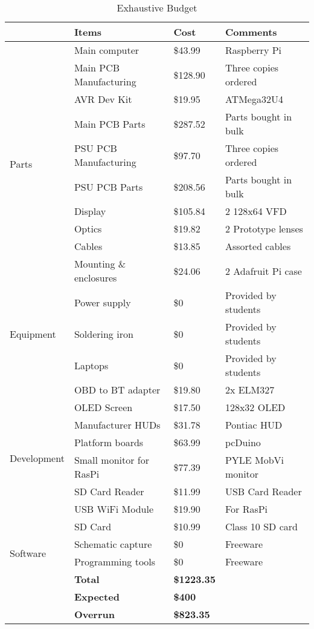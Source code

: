 \begin{table}
\centering
\begin{tabular}{|l|l|l|l|}
\hline
 & Items & Cost & Comments \\ \hline
\multirow{10}{*}{Parts}
 & Main computer            & \$43.99  & Raspberry Pi \cite{raspifaq} \\
 & Main PCB Manufacturing   & \$128.90 & Three copies ordered \\
 & AVR Dev Kit              & \$19.95  & ATMega32U4 \cite{atmega32u4ds} \\
 & Main PCB Parts           & \$287.52 & Parts bought in bulk \\
 & PSU PCB Manufacturing    & \$97.70  & Three copies ordered \\
 & PSU PCB Parts            & \$208.56 & Parts bought in bulk \\
 & Display                  & \$105.84  & 2 128x64  VFD \\
 & Optics                   & \$19.82  & 2 Prototype lenses \\
 & Cables                   & \$13.85  & Assorted cables \\
 & Mounting \& enclosures   & \$24.06  & 2 Adafruit Pi case \\ \hline
\multirow{3}{*}{Equipment}
 & Power supply             & \$0   & Provided by students \\
 & Soldering iron           & \$0   & Provided by students \\
 & Laptops                  & \$0   & Provided by students \\ \hline
\multirow{8}{*}{Development}
 & OBD to BT adapter & \$19.80 & 2x ELM327 \\
 & OLED Screen              & \$17.50 & 128x32 OLED \\
 & Manufacturer HUDs        & \$31.78 & Pontiac HUD \\
 & Platform boards          & \$63.99 & pcDuino \\
 & Small monitor for RasPi  & \$77.39 & PYLE MobVi monitor \\
 & SD Card Reader           & \$11.99 & USB Card Reader \\
 & USB WiFi Module          & \$19.90 & For RasPi \\
 & SD Card                  & \$10.99 & Class 10 SD card \\
\multirow{2}{*}{Software}
 & Schematic capture        & \$0   & Freeware \\
 & Programming tools        & \$0   & Freeware \\ \hline

& \textbf{Total}    & \textbf{\$1223.35 } & \\ \hline
& \textbf{Expected} & \textbf{\$400 } & \\ \hline
& \textbf{Overrun} &  \textbf{\$823.35 } & \\ \hline
\end{tabular}
\caption{Exhaustive Budget}
\label{tab:budget}
\end{table}

